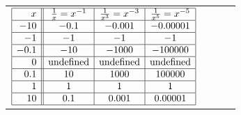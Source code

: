 \documentclass{ximera}
\begin{document}
\begin{tabular}{m{2.75in}m{1.25in}m{1.25in}m{1.25in}}

$\begin{array}{|r||c|c|c|}  \hline

 x &  \frac{1}{x} = x^{-1} & \frac{1}{x^3} = x^{-3} & \frac{1}{x^5} = x^{-5} \\ \hline
 -10 & -0.1 &-0.001& -0.00001  \\  \hline
 -1 & -1 & -1&  -1\\  \hline
 -0.1 & -10 & -1000&  -100000 \\  \hline
 0 &  \text{undefined} &  \text{undefined}  &  \text{undefined}  \\  \hline
 0.1 & 10 & 1000&  100000 \\  \hline
 1 & 1 & 1&  1\\  \hline
 10 & 0.1 & 0.001& 0.00001  \\  \hline

\end{array}$

&


&


&


\end{tabular}
\end{document}
